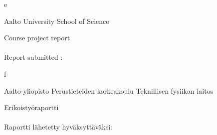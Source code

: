 \begin{titlepage}

{\sffamily

\if\mylang e

\noindent
\fontsize{12}{14}\selectfont
Aalto University \newline
School of Science \newline

\vspace{40mm}

\noindent
\fontsize{14}{16}\selectfont
\myauthor

\vspace{10mm}

\noindent
\fontsize{18}{22}\selectfont
\textbf{\mytitle}

\vspace{90mm}

\noindent
\fontsize{12}{14}\selectfont
Course project report \\[4mm]
\mycourse \\[4mm]
Report submitted : \mypubdate \\[4mm]

\fi

\if\mylang f

\noindent
\fontsize{12}{14}\selectfont
Aalto-yliopisto \newline
Perustieteiden korkeakoulu \newline
Teknillisen fysiikan laitos

\vspace{40mm}

\noindent
\fontsize{14}{16}\selectfont
\myauthor

\vspace{10mm}

\noindent
\fontsize{18}{22}\selectfont
\textbf{\mytitle}

\vspace{90mm}

\noindent
\fontsize{12}{14}\selectfont
Erikoistyöraportti \\[4mm]
\mycourse \\[4mm]
Raportti lähetetty hyväksyttäväksi: \mypubdate \\[4mm]
\mbox{}\\[4mm]
 \mysupervisor \\[4mm]
 \myinstructor

}
\end{titlepage}
